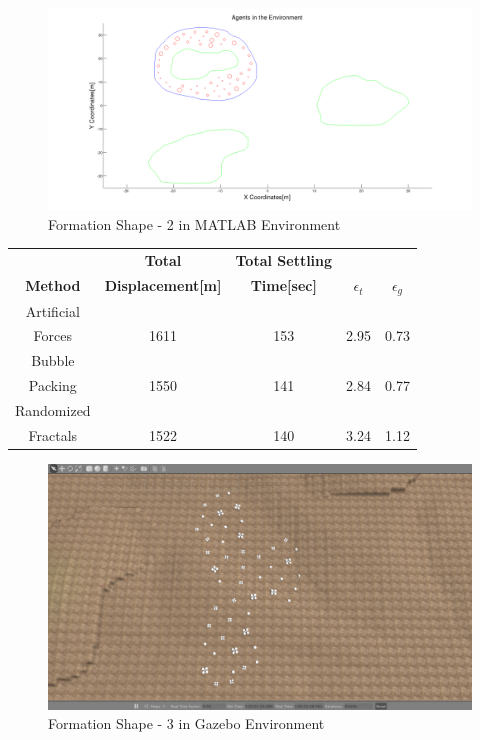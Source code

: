 \begin{figure}[H]
\caption{Formation Shape - 2 in MATLAB Environment}
\centerline{\includegraphics[scale = 0.32]{2}}
\end{figure} 
		 

		 
\begin{center}
 \label{perf_shape2} 
\begin{tabular}{|c|c|c|c|c|}
					
\hline
\textbf{} & \textbf{Total}  & \textbf{Total Settling} & \textbf{} & \textbf{} \\ \textbf{Method} & \textbf{Displacement[m]} & \textbf{Time[sec]}& \textbf{$\epsilon_t$} & \textbf{$\epsilon_g$} \\
\hline
Artificial&  &  &  & \\
 Forces & 1611 & 153& 2.95 & 0.73\\
 \hline
 Bubble&  &  &  & \\
 Packing &1550 &141 &2.84 & 0.77\\
\hline
 Randomized&  &  &  & \\
 Fractals &1522 &140 &3.24 & 1.12\\
\hline
\end{tabular}
\end{center}
		 		

		 
\begin{figure}[H]
\caption{Formation Shape - 3 in Gazebo Environment}
\centerline{\includegraphics[scale = 0.32]{3_Gazebo}}
\end{figure} 
				 
